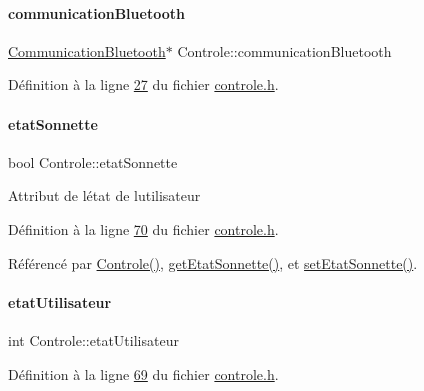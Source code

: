 \paragraph{\texorpdfstring{communication\+Bluetooth}{communicationBluetooth}}
{\footnotesize\ttfamily \hyperlink{class_communication_bluetooth}{Communication\+Bluetooth}$\ast$ Controle\+::communication\+Bluetooth\hspace{0.3cm}{\ttfamily [private]}}



Définition à la ligne \hyperlink{controle_8h_source_l00027}{27} du fichier \hyperlink{controle_8h_source}{controle.\+h}.

\mbox{\label{class_controle_afddf1dce812ff88577e308684b564f33}} 
\paragraph{\texorpdfstring{etat\+Sonnette}{etatSonnette}}
{\footnotesize\ttfamily bool Controle\+::etat\+Sonnette\hspace{0.3cm}{\ttfamily [private]}}

Attribut de l\textquotesingle{}état de l\textquotesingle{}utilisateur 

Définition à la ligne \hyperlink{controle_8h_source_l00070}{70} du fichier \hyperlink{controle_8h_source}{controle.\+h}.



Référencé par \hyperlink{controle_8cpp_source_l00005}{Controle()}, \hyperlink{controle_8cpp_source_l00033}{get\+Etat\+Sonnette()}, et \hyperlink{controle_8cpp_source_l00028}{set\+Etat\+Sonnette()}.

\mbox{\label{class_controle_a690595803de8f5c172b8bc46122ebb1a}} 
\paragraph{\texorpdfstring{etat\+Utilisateur}{etatUtilisateur}}
{\footnotesize\ttfamily int Controle\+::etat\+Utilisateur\hspace{0.3cm}{\ttfamily [private]}}



Définition à la ligne \hyperlink{controle_8h_source_l00069}{69} du fichier \hyperlink{controle_8h_source}{controle.\+h}.



